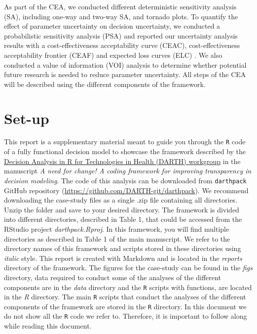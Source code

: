 \documentclass[]{book}
\begin{document}
As part of the CEA, we conducted different deterministic sensitivity
analysis (SA), including one-way and two-way SA, and tornado plots. To
quantify the effect of parameter uncertainty on decision uncertainty, we
conducted a probabilistic sensitivity analysis (PSA) and reported our
uncertainty analysis results with a cost-effectiveness acceptability
curve (CEAC), cost-effectiveness acceptability frontier (CEAF) and
expected loss curves (ELC) \citep{Alarid-Escudero2019}. We also
conducted a value of information (VOI) analysis to determine whether
potential future research is needed to reduce parameter uncertainty. All
steps of the CEA will be described using the different components of the
framework.

\section*{Set-up}\label{set-up}

This report is a supplementary material meant to guide you through the
\texttt{R} code of a fully functional decision model to showcase the
framework described by the \href{http://darthworkgroup.com/}{Decision
Analysis in R for Technologies in Health (DARTH) workgroup} in the
manuscript \emph{A need for change! A coding framework for improving
transparency in decision modeling}. The code of this analysis can be
downloaded from \texttt{darthpack} GitHub repository
(\url{https://github.com/DARTH-git/darthpack}). We recommend downloading
the case-study files as a single .zip file containing all directories.
Unzip the folder and save to your desired directory. The framework is
divided into different directories, described in Table 1, that could be
accessed from the RStudio project \emph{darthpack.Rproj}. In this
framework, you will find multiple directories as described in Table 1 of
the main manuscript. We refer to the directory names of this framework
and scripts stored in these directories using \emph{italic} style. This
report is created with Markdown and is located in the \emph{reports}
directory of the framework. The figures for the case-study can be found
in the \emph{figs} directory, data required to conduct some of the
analyses of the different components are in the \emph{data} directory
and the \texttt{R} scripts with functions, are located in the \emph{R}
directory. The main \texttt{R} scripts that conduct the analyses of the
different components of the framework are stored in the \texttt{R}
directory. In this document we do not show all the \texttt{R} code we
refer to. Therefore, it is important to follow along while reading this
document.
\end{document}
